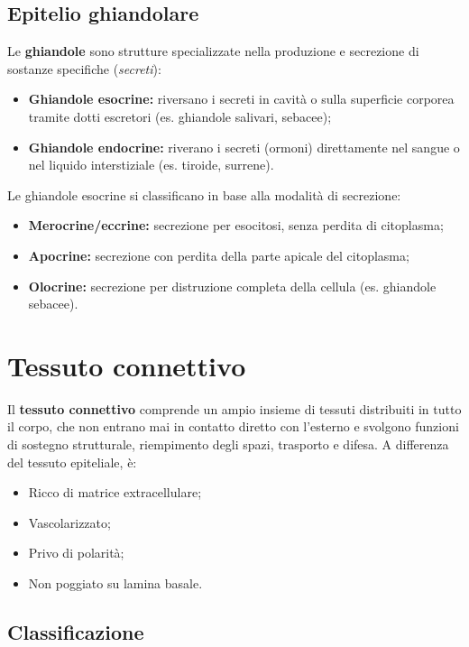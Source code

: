 \documentclass[11pt,a4paper,openright,twoside]{book}
\theoremstyle{definition}
\theoremstyle{plain}
\theoremstyle{remark}
\begin{document}
\subsection{Epitelio ghiandolare}

Le \textbf{ghiandole} sono strutture specializzate nella produzione e secrezione di sostanze specifiche (\textit{secreti}):
\begin{itemize}
  \item \textbf{Ghiandole esocrine:} riversano i secreti in cavità o sulla superficie corporea tramite dotti escretori (es. ghiandole salivari, sebacee);
  \item \textbf{Ghiandole endocrine:} riverano i secreti (ormoni) direttamente nel sangue o nel liquido interstiziale (es. tiroide, surrene).
\end{itemize}

Le ghiandole esocrine si classificano in base alla modalità di secrezione:
\begin{itemize}
  \item \textbf{Merocrine/eccrine:} secrezione per esocitosi, senza perdita di citoplasma;
  \item \textbf{Apocrine:} secrezione con perdita della parte apicale del citoplasma;
  \item \textbf{Olocrine:} secrezione per distruzione completa della cellula (es. ghiandole sebacee).
\end{itemize}

\section{Tessuto connettivo}

Il \textbf{tessuto connettivo} comprende un ampio insieme di tessuti distribuiti in tutto il corpo, che non entrano mai in contatto diretto con l'esterno e svolgono funzioni di sostegno strutturale, riempimento degli spazi, trasporto e difesa. A differenza del tessuto epiteliale, è:
\begin{itemize}
  \item Ricco di matrice extracellulare;
  \item Vascolarizzato;
  \item Privo di polarità;
  \item Non poggiato su lamina basale.
\end{itemize}

\subsection{Classificazione}
\end{document}
